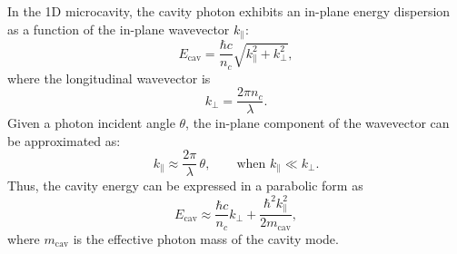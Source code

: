 In the 1D microcavity, the cavity photon exhibits an in-plane energy dispersion as a function of the in-plane wavevector $k_{\parallel}$\cite{Deng2010-ul}:
\begin{equation}
E_{\mathrm{cav}} = \frac{\hbar c}{n_c} \sqrt{k_{\parallel}^2 + k_{\perp}^2},
\label{eq:cavity_dispersion}
\end{equation}
\vspace{-0.5em}
where the longitudinal wavevector is 
\vspace{-0.5em}
\begin{equation}
k_{\perp} = \frac{2\pi n_c}{\lambda}.
\label{eq:k_perp}
\end{equation}\vspace{-0.5em}
Given a photon incident angle $\theta$, the in-plane component of the wavevector can be approximated as:
\begin{equation}
k_{\parallel} \approx \frac{2\pi}{\lambda} \, \theta, 
\qquad \text{when } k_{\parallel} \ll k_{\perp}.
\label{eq:k_parallel}
\end{equation}\vspace{-0.5em}
Thus, the cavity energy can be expressed in a parabolic form as
\begin{equation}
E_{\mathrm{cav}} \approx \frac{\hbar c}{n_c} k_{\perp} 
+ \frac{\hbar^2 k_{\parallel}^2}{2 m_{\mathrm{cav}}},
\label{eq:cavity_parabola}
\end{equation}
where $m_{\mathrm{cav}}$ is the effective photon mass of the cavity mode.

